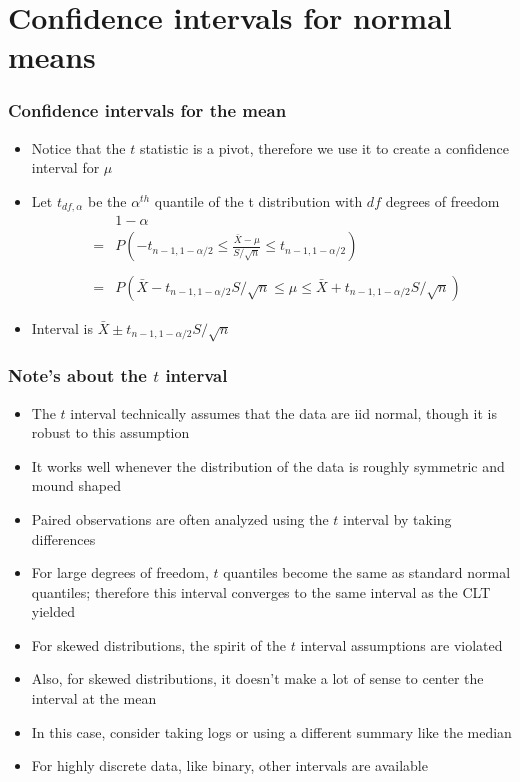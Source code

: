 \documentclass[aspectratio=169]{beamer}
\begin{document}
\section{Confidence intervals for normal means}
\begin{frame}\frametitle{Confidence intervals for the mean}
\begin{itemize}
\item Notice that the $t$ statistic is a pivot, therefore we use it
  to create a confidence interval for $\mu$
\item Let $t_{df,\alpha}$ be the $\alpha^{th}$ quantile of the t distribution with
  $df$ degrees of freedom
  \begin{eqnarray*}
&   & 1 - \alpha \\
& = & P\left(-t_{n-1,1-\alpha/2} \leq \frac{\bar X - \mu}{S/\sqrt{n}} \leq t_{n-1,1-\alpha/2}\right) \\ \\
& = & P\left(\bar X - t_{n-1,1-\alpha/2} S / \sqrt{n} \leq \mu  
      \leq \bar X + t_{n-1,1-\alpha/2}S /\sqrt{n}\right)
  \end{eqnarray*}
\item Interval is $\bar X \pm t_{n-1,1-\alpha/2} S/\sqrt{n}$
\end{itemize}
\end{frame}

\begin{frame}\frametitle{Note's about the $t$ interval}
\begin{itemize}
\item The $t$ interval technically assumes that the data are iid normal,
  though it is robust to this assumption
\item It works well whenever the distribution of the data is roughly
  symmetric and mound shaped
\item Paired observations are often analyzed using the $t$ interval by
  taking differences
\item For large degrees of freedom, $t$ quantiles become the same as standard
  normal quantiles; therefore this interval converges to the same interval as
  the CLT yielded
\end{itemize}
\end{frame}

\begin{frame}
\begin{itemize}
\item For skewed distributions, the spirit of the $t$ interval
  assumptions are violated
\item Also, for skewed distributions, it doesn't make a lot of sense
  to center the interval at the mean
\item In this case, consider taking logs or using a different summary
  like the median
\item For highly discrete data, like binary, other intervals are available
\end{itemize}
\end{frame}
\end{document}
